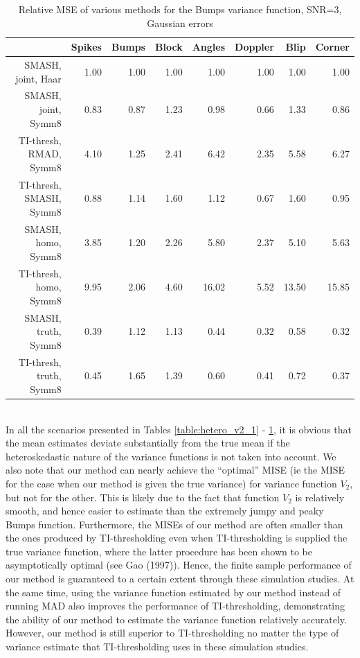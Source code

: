 \documentclass[12pt]{article}
\begin{document}
\begin{table}[ht]
\centering
\begin{tabular}{rrrrrrrr}
  \hline
 & Spikes & Bumps & Block & Angles & Doppler & Blip & Corner \\
  \hline
SMASH, joint, Haar & 1.00 & 1.00 & 1.00 & 1.00 & 1.00 & 1.00 & 1.00 \\
  SMASH, joint, Symm8 & 0.83 & 0.87 & 1.23 & 0.98 & 0.66 & 1.33 & 0.86 \\
  TI-thresh, RMAD, Symm8 & 4.10 & 1.25 & 2.41 & 6.42 & 2.35 & 5.58 & 6.27 \\
  TI-thresh, SMASH, Symm8 & 0.88 & 1.14 & 1.60 & 1.12 & 0.67 & 1.60 & 0.95 \\
  SMASH, homo, Symm8 & 3.85 & 1.20 & 2.26 & 5.80 & 2.37 & 5.10 & 5.63 \\
  TI-thresh, homo, Symm8 & 9.95 & 2.06 & 4.60 & 16.02 & 5.52 & 13.50 & 15.85 \\
  SMASH, truth, Symm8 & 0.39 & 1.12 & 1.13 & 0.44 & 0.32 & 0.58 & 0.32 \\
  TI-thresh, truth, Symm8 & 0.45 & 1.65 & 1.39 & 0.60 & 0.41 & 0.72 & 0.37 \\
   \hline
\end{tabular}
\caption{Relative MSE of various methods for the Bumps variance function, SNR=3, Gaussian errors} 
\label{table:hetero_bump_3}
\end{table}
\bigskip\\
In all the scenarios presented in Tables \ref{table:hetero_v2_1} - \ref{table:hetero_bump_3}, it is obvious that the mean estimates deviate substantially from the true mean if the heteroskedastic nature of the variance functions is not taken into account. We also note that our method can nearly achieve the ``optimal'' MISE (ie the MISE for the case when our method is given the true variance) for variance function $V_2$, but not for the other. This is likely due to the fact that function $V_2$ is relatively smooth, and hence easier to estimate than the extremely jumpy and peaky Bumps function. Furthermore, the MISEs of our method are often smaller than the ones produced by TI-thresholding even when TI-thresholding is supplied the true variance function, where the latter procedure has been shown to be asymptotically optimal (see Gao (1997)). Hence, the finite sample performance of our method is guaranteed to a certain extent through these simulation studies. At the same time, using the variance function estimated by our method instead of running MAD also improves the performance of TI-thresholding, demonstrating the ability of our method to estimate the variance function relatively accurately. However, our method is still superior to TI-thresholding no matter the type of variance estimate that TI-thresholding uses in these simulation studies.\bigskip\\
\end{document}
